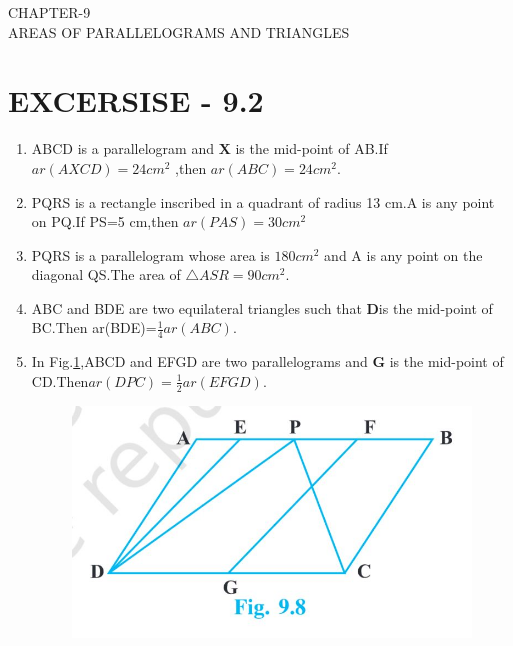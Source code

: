 \documentclass{article}
\let\vec\mathbf{}
\let\vec\mathbf
\begin{document}
\begin{center}
\textbf\large{CHAPTER-9  \\ AREAS OF PARALLELOGRAMS AND TRIANGLES}
\section*{EXCERSISE - 9.2}
\end{center}
\begin{enumerate}
	\item ABCD is a parallelogram and $\vec{X}$ is the mid-point of AB.If $ ar(AXCD)= 24 cm^2 $ ,then $ar(ABC) =  24cm^2 $.
\item PQRS is a rectangle inscribed in a quadrant of radius 13 cm.A is any point on PQ.If PS=5 cm,then $ar(PAS)= 30 cm^2 $
\item PQRS is a parallelogram whose area is $ 180 cm^2 $ and A is any point on the diagonal QS.The area of $\triangle ASR =90 cm^2$.
\item ABC and BDE are two equilateral triangles such that $\vec{D}$is the mid-point of BC.Then ar(BDE)=$\frac{1}{4}  ar(ABC)$.
\item In Fig.\ref{fig:9.8},ABCD and EFGD are two parallelograms and $\vec{G}$ is the mid-point of CD.Then$ ar(DPC)=\frac{1}{2}  ar(EFGD)$.
	\begin{figure}[h]
		\centering
		\includegraphics[width=\columnwidth]{figs/9.8.jpg}
		\caption{}
		\label{fig:9.8}
	\end{figure}

\end{enumerate}
\end{document}
